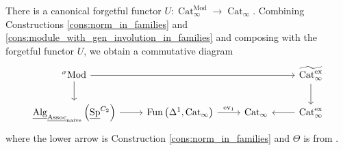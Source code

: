 \documentclass{article}
\DeclareMathOperator{\Alg}{Alg}
\DeclareMathOperator{\Cat}{Cat} %
\DeclareMathOperator{\Catex}{\Cat_\infty^{ex}} %
\DeclareMathOperator{\Fun}{Fun} %
\DeclareMathOperator{\Mod}{Mod} %
\DeclareMathOperator{\Modh}{{}^{\sigma}Mod} %
\DeclareMathOperator{\Spectra}{Sp} %
\newcommand{\ev}{\mathrm{ev}}
\theoremstyle{definition}
\begin{document}
There is a canonical forgetful functor $ U \colon \Cat^{\Mod}_\infty \to \Cat_\infty $. %
Combining Constructions \ref{cons:norm_in_families} and \ref{cons:module_with_gen_involution_in_families} and composing with the forgetful functor $ U $, we obtain a commutative diagram
\begin{equation}\label{diagram:calgp_to_functor_cat_with_pointed_target}
\begin{tikzcd}
    \Modh \ar[rrr] \ar[d] & & & \widetilde{\Catex} \ar[d] \\ 
    \underline{\Alg}_{\underline{\mathrm{Assoc}}_{\mathrm{naive}}}\left(\underline{\Spectra}^{C_2}\right) \ar[r] & \Fun\left(\Delta^1, \Cat_\infty \right) \ar[r,"{\ev_1}"] & \Cat_\infty & \Catex \ar[l] 
\end{tikzcd}
\end{equation}
where the lower arrow is Construction \ref{cons:norm_in_families} and $ \Theta $ is from \cite[Construction 4.8.3.24]{LurHA}. 
\end{document}
